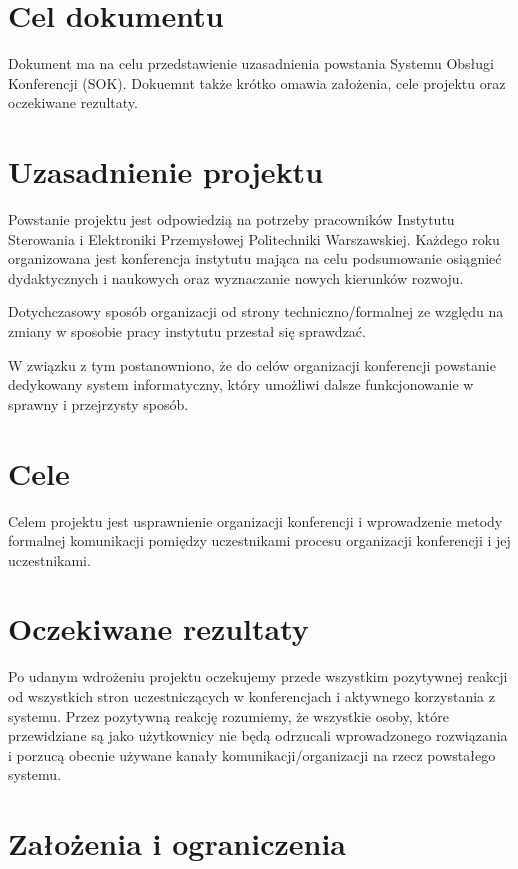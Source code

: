 \section{Cel dokumentu}
\suppressfloats[t]

Dokument ma na celu przedstawienie uzasadnienia powstania Systemu Obsługi Konferencji (SOK). Dokuemnt także krótko omawia założenia, cele projektu oraz oczekiwane rezultaty.


\section{Uzasadnienie projektu}

Powstanie projektu jest odpowiedzią na potrzeby pracowników Instytutu Sterowania i Elektroniki Przemysłowej Politechniki Warszawskiej.
Każdego roku organizowana jest konferencja instytutu mająca na celu podsumowanie osiągnieć dydaktycznych i naukowych oraz wyznaczanie nowych kierunków rozwoju. 

\bigskip
\noindent Dotychczasowy sposób organizacji od strony techniczno/formalnej ze względu na zmiany w sposobie pracy instytutu przestał się sprawdzać. 

\bigskip
\noindent W związku z tym postanowniono, że do celów organizacji konferencji powstanie dedykowany system informatyczny, który umożliwi dalsze funkcjonowanie w sprawny i przejrzysty sposób. 

\section{Cele}

Celem projektu jest usprawnienie organizacji konferencji i wprowadzenie metody formalnej komunikacji pomiędzy uczestnikami procesu organizacji konferencji i jej uczestnikami. 

\section{Oczekiwane rezultaty}

Po udanym wdrożeniu projektu oczekujemy przede wszystkim pozytywnej reakcji od wszystkich stron uczestniczących w konferencjach i aktywnego korzystania z systemu. Przez pozytywną reakcję rozumiemy, że wszystkie osoby, które przewidziane są jako użytkownicy nie będą odrzucali wprowadzonego rozwiązania i porzucą obecnie używane kanały komunikacji/organizacji na rzecz powstałego systemu.

\section{Założenia i ograniczenia}

